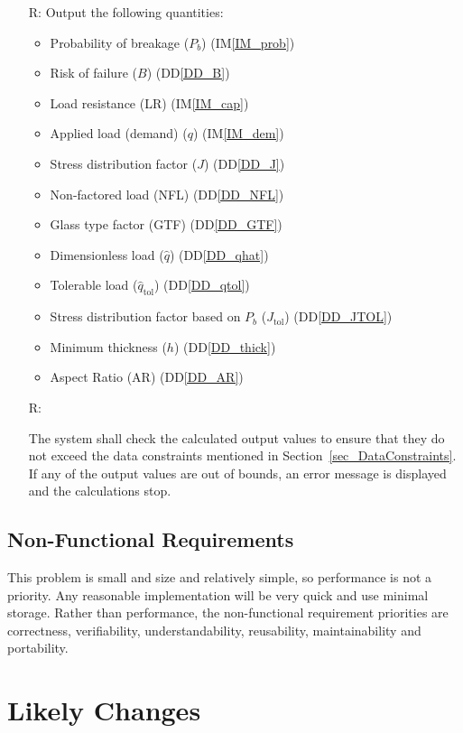 \documentclass[12pt]{article}
\newcommand{\ddref}[1]{DD\ref{#1}}
\newcommand{\iref}[1]{IM\ref{#1}}
\newcounter{reqnum} %
\begin{document}
\begin{itemize}
\item[R\refstepcounter{reqnum}\thereqnum \label{R_Output}:]
  Output the following quantities:
\begin{itemize}
\item Probability of breakage ($P_b$) (\iref{IM_prob})
\item Risk of failure ($B$) (\ddref{DD_B})
\item Load resistance (LR) (\iref{IM_cap})
\item Applied load (demand) ($q$) (\iref{IM_dem})
\item Stress distribution factor ($J$) (\ddref{DD_J})
\item Non-factored load (NFL) (\ddref{DD_NFL})
\item Glass type factor (GTF) (\ddref{DD_GTF})
\item Dimensionless load ($\hat{q}$) (\ddref{DD_qhat})
\item Tolerable load ($\hat{q}_{\text{tol}}$) (\ddref{DD_qtol})
\item Stress distribution factor based on $P_b$ ($J_{\text{tol}}$) (\ddref{DD_JTOL})
\item Minimum thickness ($h$) (\ddref{DD_thick})
\item Aspect Ratio (AR) (\ddref{DD_AR})
\end{itemize}

\item[R\refstepcounter{reqnum}\thereqnum \label{Verify}:]

  The system shall check the calculated output values to ensure that they do not
  exceed the data constraints mentioned in Section~\ref{sec_DataConstraints}.  If any of
  the output values are out of bounds, an error message is displayed and the
  calculations stop.

\end{itemize}

\subsection{Non-Functional Requirements}

This problem is small and size and relatively simple, so performance is
not a priority.  Any reasonable implementation will be very quick and use
minimal storage.  Rather than performance, the  non-functional requirement
priorities are correctness, verifiability, understandability, reusability, 
maintainability and portability.

\section{Likely Changes} \label{sec_like}
\end{document}
